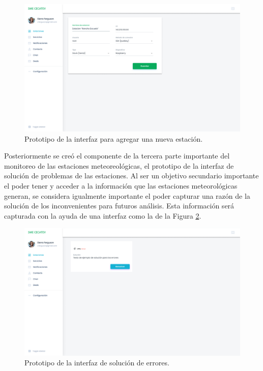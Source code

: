 \begin{figure}[!ht]
	\centering
	\includegraphics[width=1\linewidth]{images/diagrams/1.0.0_Stations_add.png}
	\caption{Prototipo de la interfaz para agregar una nueva estación.}
	\label{fig:prototype_add_station}
\end{figure}

\pagebreak

Posteriormente se creó el componente de la tercera parte importante del monitoreo de las estaciones meteoreológicas, el prototipo de la interfaz de solución de problemas de las estaciones. Al ser un objetivo secundario importante el poder tener y acceder a la información que las estaciones meteorológicas generan, se considera igualmente importante el poder capturar una razón de la solución de los inconvenientes para futuros análisis. Esta información será capturada con la ayuda de una interfaz como la de la Figura \ref{fig:prototype_solve_error}.

\begin{figure}[!ht]
	\centering
	\includegraphics[width=1\linewidth]{images/diagrams/0.1.1_Station_Failing.png}
	\caption{Prototipo de la interfaz de solución de errores.}
	\label{fig:prototype_solve_error}
\end{figure}

